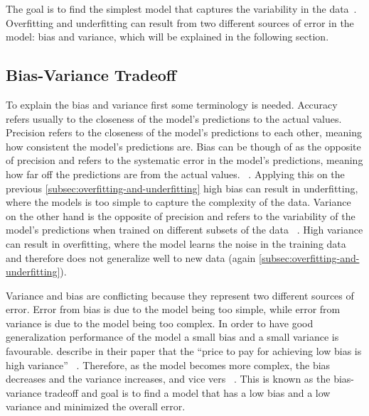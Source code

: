 The goal is to find the simplest model that captures the variability in the
data~\cite[p. 35]{muller_introductionmachinelearning_2016}.
Overfitting and underfitting can result from two different sources of error in the model: bias and variance, which
will be explained in the following section.

\subsection{Bias-Variance Tradeoff}\label{subsec:bias-variance-tradeoff}
To explain the bias and variance first some terminology is needed.
Accuracy refers usually to the closeness of the model's predictions to the actual values.
Precision refers to the closeness of the model's predictions to each other, meaning how consistent the model's
predictions
are.
Bias can be though of as the opposite of precision and refers to the systematic error in the model's predictions,
meaning how far off the predictions are from the actual values.
~\cite[p. 2]{doroudi2020bias}.
Applying this on the previous \cref{subsec:overfitting-and-underfitting} high bias can result in underfitting, where
the models is too simple to capture the complexity of the data.
Variance on the other hand is the opposite of precision and refers to the variability of the model's predictions when
trained on different subsets of the data
~\cite[p. 2]{doroudi2020bias}.
High variance can result in overfitting, where the model learns the noise in the training data and therefore does not
generalize well to new data (again \cref{subsec:overfitting-and-underfitting}).

Variance and bias are conflicting because they represent two different sources of error.
Error from bias is due to the model being too simple, while error from variance is due to the model being too
complex.
In order to have good generalization performance of the model a small bias and a small variance is favourable.
\cite{geman1992neural} describe in their paper that the ``price to pay for achieving low bias is high variance''
~\cite[p. 14]{geman1992neural}.
Therefore, as the model becomes more complex, the bias decreases and the variance increases, and vice vers
~\cite[p. 14]{geman1992neural}.
This is known as the bias-variance tradeoff and goal is to find a model that has a low bias and a low variance
and minimized the overall error.

